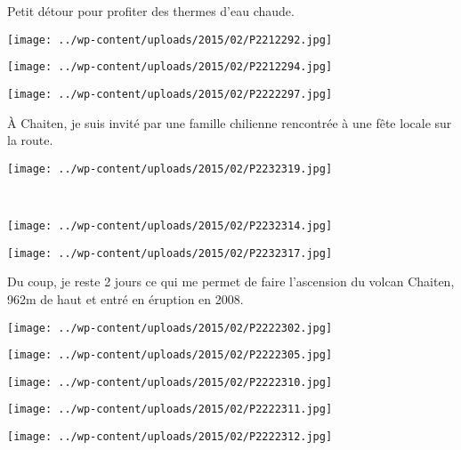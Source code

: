 \pagebreak
Petit détour pour profiter des thermes d'eau chaude.
\begin{center} \texttt{[image: ../wp-content/uploads/2015/02/P2212292.jpg]} \end{center}
\begin{center} \texttt{[image: ../wp-content/uploads/2015/02/P2212294.jpg]} \end{center}
\begin{center} \texttt{[image: ../wp-content/uploads/2015/02/P2222297.jpg]} \end{center}

\`A Chaiten, je suis invité par une famille chilienne rencontrée à une fête locale sur la route.
\begin{center} \texttt{[image: ../wp-content/uploads/2015/02/P2232319.jpg]} \end{center}
\vspace{-\topsep}

\pagebreak
~\\
\begin{center} \texttt{[image: ../wp-content/uploads/2015/02/P2232314.jpg]} \end{center}
\begin{center} \texttt{[image: ../wp-content/uploads/2015/02/P2232317.jpg]} \end{center}
\vspace{-\topsep}
\vspace{-3mm}

\pagebreak
Du coup, je reste 2 jours ce qui me permet de faire l'ascension du volcan Chaiten, 962m de haut et entré en éruption en 2008.
\begin{center} \texttt{[image: ../wp-content/uploads/2015/02/P2222302.jpg]} \end{center}
\begin{center} \texttt{[image: ../wp-content/uploads/2015/02/P2222305.jpg]} \end{center}
\begin{center} \texttt{[image: ../wp-content/uploads/2015/02/P2222310.jpg]} \end{center}
\begin{center} \texttt{[image: ../wp-content/uploads/2015/02/P2222311.jpg]} \end{center}
\begin{center} \texttt{[image: ../wp-content/uploads/2015/02/P2222312.jpg]} \end{center}

